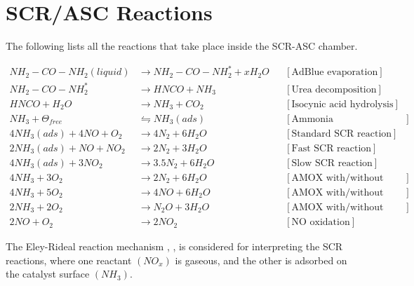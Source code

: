 \newpage
\section{SCR/ASC Reactions}
The following lists all the reactions that take place inside the SCR-ASC chamber.

\begin{align*}
    NH_2 - CO - NH_2 (liquid) &\longrightarrow NH_2 - CO - NH_2^* + x H_2 O
                & &[\text{AdBlue evaporation}] \\
    NH_2 - CO - NH_2^*  &\longrightarrow  HNCO + NH_3
                & &[\text{Urea decomposition}] \\
    HNCO + H_2O &\longrightarrow NH_3 + CO_2
                & &[\text{Isocynic acid hydrolysis}] \\
    NH_3 + \Theta_{free} &\leftrightharpoons NH_3(ads)
                         & &[\text{Ammonia Adsorption/Desorption}]\\
    4 NH_3 (ads) + 4 NO + O_2 &\longrightarrow 4 N_2 + 6 H_2O
                              & &[\text{Standard SCR reaction}]\\
    2 NH_3 (ads) +  NO + N O_2 &\longrightarrow 2 N_2 + 3 H_2O
                              & &[\text{Fast SCR reaction}]\\
    4 NH_3 (ads) + 3N O_2 &\longrightarrow 3.5 N_2 + 6 H_2O
                              & &[\text{Slow SCR reaction}]\\
    4 NH_3 + 3 O_2 &\longrightarrow 2 N_2 + 6 H_2O
                         & &[\text{AMOX with/without ASC}]\\
    4 NH_3 + 5 O_2 &\longrightarrow 4 NO + 6 H_2 O
                         & &[\text{AMOX with/without ASC}]\\
    2 NH_3 + 2 O_2 &\longrightarrow N_2O + 3 H_2O
                         & &[\text{AMOX with/without ASC}]\\
    2 NO + O_2 &\longrightarrow 2 NO_2
                        & &[\text{NO oxidation}]
\end{align*}

The Eley-Rideal reaction mechanism \cite{yuan2015diesel}, \cite{hsieh2011development}, \cite{nova2014urea} is considered
for interpreting the SCR reactions, where one reactant $(NO_x)$ is gaseous, and the other is adsorbed on the catalyst
surface $(NH_3)$.


